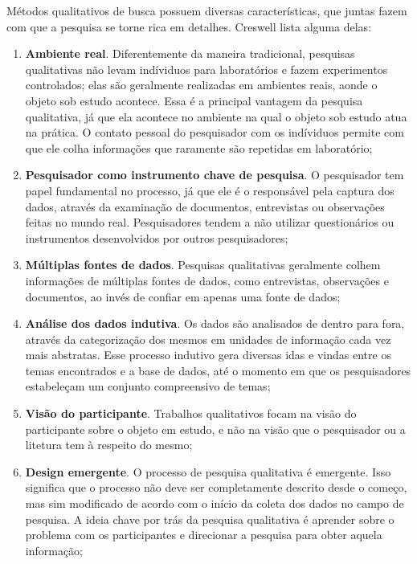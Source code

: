 Métodos qualitativos de busca possuem diversas características, que juntas fazem
com que a pesquisa se torne rica em detalhes. Creswell \cite{creswell} lista
alguma delas:

\begin{enumerate}
  
  \item \textbf{Ambiente real}. Diferentemente da maneira tradicional,
  pesquisas qualitativas não levam indíviduos para laboratórios e fazem experimentos
  controlados; elas são geralmente realizadas em ambientes reais, aonde o objeto
  sob estudo acontece. Essa é a principal vantagem da pesquisa qualitativa, já
  que ela acontece no ambiente na qual o objeto sob estudo atua na prática. O
  contato pessoal do pesquisador com os indíviduos permite com que ele colha
  informações que raramente são repetidas em laboratório;
  
  \item \textbf{Pesquisador como instrumento chave de pesquisa}. O pesquisador
  tem papel fundamental no processo, já que ele é o responsável pela captura dos
  dados, através da examinação de documentos, entrevistas ou observações feitas
  no mundo real. Pesquisadores tendem a não utilizar questionários ou
  instrumentos desenvolvidos por outros pesquisadores;
  
  \item \textbf{Múltiplas fontes de dados}. Pesquisas qualitativas geralmente
  colhem informações de múltiplas fontes de dados, como entrevistas,
  observações e documentos, ao invés de confiar em apenas uma fonte de dados;
  
  \item \textbf{Análise dos dados indutiva}. Os dados são analisados de dentro
  para fora, através da categorização dos mesmos em unidades de informação cada
  vez mais abstratas. Esse processo indutivo gera diversas idas e vindas entre
  os temas encontrados e a base de dados, até o momento em que os pesquisadores
  estabeleçam um conjunto compreensivo de temas;
  
  \item \textbf{Visão do participante}. Trabalhos qualitativos focam na visão do
  participante sobre o objeto em estudo, e não na visão que o pesquisador ou a
  litetura tem à respeito do mesmo;
  
  \item \textbf{Design emergente}. O processo de pesquisa qualitativa é
  emergente. Isso significa que o processo não deve ser completamente descrito
  desde o começo, mas sim modificado de acordo com o início da coleta dos dados
  no campo de pesquisa. A ideia chave por trás da pesquisa qualitativa é
  aprender sobre o problema com os participantes e direcionar a pesquisa para
  obter aquela informação;
  

\end{enumerate}
